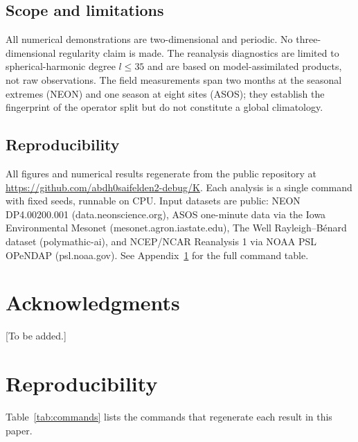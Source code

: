 \documentclass[11pt]{article}
\begin{document}
\subsection{Scope and limitations}

All numerical demonstrations are two-dimensional and periodic. No
three-dimensional regularity claim is made. The reanalysis diagnostics are limited
to spherical-harmonic degree $l \leq 35$ and are based on model-assimilated
products, not raw observations. The field measurements span two months at the
seasonal extremes (NEON) and one season at eight sites (ASOS); they establish the
fingerprint of the operator split but do not constitute a global climatology.

\subsection{Reproducibility}

All figures and numerical results regenerate from the public repository at
\url{https://github.com/abdh0saifelden2-debug/K}. Each analysis is a single
command with fixed seeds, runnable on CPU. Input datasets are public: NEON
DP4.00200.001 (data.neonscience.org), ASOS one-minute data via the Iowa
Environmental Mesonet (mesonet.agron.iastate.edu), The Well Rayleigh--B\'enard
dataset (polymathic-ai), and NCEP/NCAR Reanalysis 1 via NOAA PSL OPeNDAP
(psl.noaa.gov). See Appendix~\ref{app:reproducibility} for the full command table.

\section*{Acknowledgments}

[To be added.]

\appendix

\section{Reproducibility}
\label{app:reproducibility}

Table~\ref{tab:commands} lists the commands that regenerate each result in this
paper.
\end{document}
